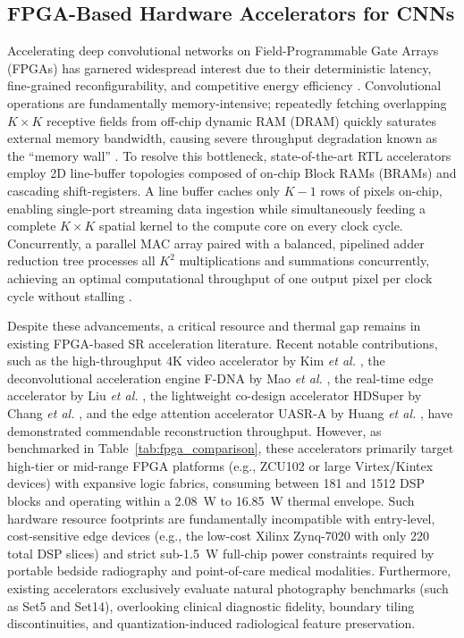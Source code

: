 \documentclass[conference]{IEEEtran}
\begin{document}
\subsection{FPGA-Based Hardware Accelerators for CNNs}

Accelerating deep convolutional networks on Field-Programmable Gate Arrays (FPGAs) has garnered widespread interest due to their deterministic latency, fine-grained reconfigurability, and competitive energy efficiency \cite{sze2017efficient, mittal2020survey}. Convolutional operations are fundamentally memory-intensive; repeatedly fetching overlapping $K \times K$ receptive fields from off-chip dynamic RAM (DRAM) quickly saturates external memory bandwidth, causing severe throughput degradation known as the ``memory wall'' \cite{sze2017efficient}. To resolve this bottleneck, state-of-the-art RTL accelerators employ 2D line-buffer topologies composed of on-chip Block RAMs (BRAMs) and cascading shift-registers. A line buffer caches only $K-1$ rows of pixels on-chip, enabling single-port streaming data ingestion while simultaneously feeding a complete $K \times K$ spatial kernel to the compute core on every clock cycle. Concurrently, a parallel MAC array paired with a balanced, pipelined adder reduction tree processes all $K^2$ multiplications and summations concurrently, achieving an optimal computational throughput of one output pixel per clock cycle without stalling \cite{sze2017efficient, mittal2020survey}.



Despite these advancements, a critical resource and thermal gap remains in existing FPGA-based SR acceleration literature. Recent notable contributions, such as the high-throughput 4K video accelerator by Kim \textit{et al.} \cite{kim2019real}, the deconvolutional acceleration engine F-DNA by Mao \textit{et al.} \cite{mao2020fdna}, the real-time edge accelerator by Liu \textit{et al.} \cite{liu2024high}, the lightweight co-design accelerator HDSuper by Chang \textit{et al.} \cite{chang2024hdsuper}, and the edge attention accelerator UASR-A by Huang \textit{et al.} \cite{huang2026uasr}, have demonstrated commendable reconstruction throughput. However, as benchmarked in Table~\ref{tab:fpga_comparison}, these accelerators primarily target high-tier or mid-range FPGA platforms (e.g., ZCU102 or large Virtex/Kintex devices) with expansive logic fabrics, consuming between 181 and 1512 DSP blocks and operating within a 2.08~W to 16.85~W thermal envelope. Such hardware resource footprints are fundamentally incompatible with entry-level, cost-sensitive edge devices (e.g., the low-cost Xilinx Zynq-7020 with only 220 total DSP slices) and strict sub-1.5~W full-chip power constraints required by portable bedside radiography and point-of-care medical modalities. Furthermore, existing accelerators exclusively evaluate natural photography benchmarks (such as Set5 and Set14), overlooking clinical diagnostic fidelity, boundary tiling discontinuities, and quantization-induced radiological feature preservation.
\end{document}
